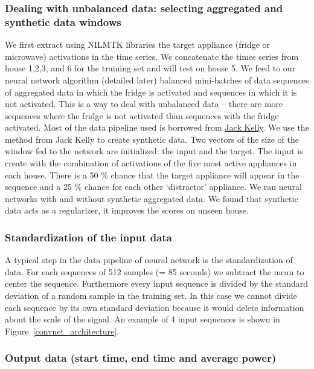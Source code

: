 \documentclass[10pt]{article}
\begin{document}
\subsubsection{Dealing with unbalanced data: selecting aggregated and synthetic data windows}

We first extract using NILMTK libraries the target appliance (fridge or microwave) activations in the time series. We concatenate the times series from house 1,2,3, and 6 for the training set and will test on house 5. We feed to our neural network algorithm (detailed later) balanced mini-batches of data sequences of aggregated data in which the fridge is activated and sequences in which it is not activated. This is a way to deal with unbalanced data -- there are more sequences where the fridge is not activated than sequences with the fridge activated. Most of the data pipeline used is borrowed from \href{https://github.com/JackKelly/neuralnilm}{Jack Kelly}. We use the method from Jack Kelly to create synthetic data. Two vectors of the size of the window fed to the network are initialized: the input and the target. The input is create with the combination of activations of the five most active appliances in each house. There is a 50 $\%$ chance that the target appliance will appear in the sequence and a 25 $\%$ chance for each other `distractor' appliance. We ran neural networks with and without synthetic aggregated data. We found that synthetic data acts as a regularizer, it improves the scores on unseen house.

\subsubsection{Standardization of the input data}

A typical step in the data pipeline of neural network is the standardization of data. For each sequences of 512 samples (= 85 seconds) we subtract the mean to center the sequence. Furthermore every input sequence is divided by the standard deviation of a random sample in the training set. In this case we cannot divide each sequence by its own standard deviation because it would delete information about the scale of the signal. An example of 4 input sequences is shown in Figure~\ref{convnet_architecture}.

\subsubsection{Output data (start time, end time and average power)}
\end{document}
